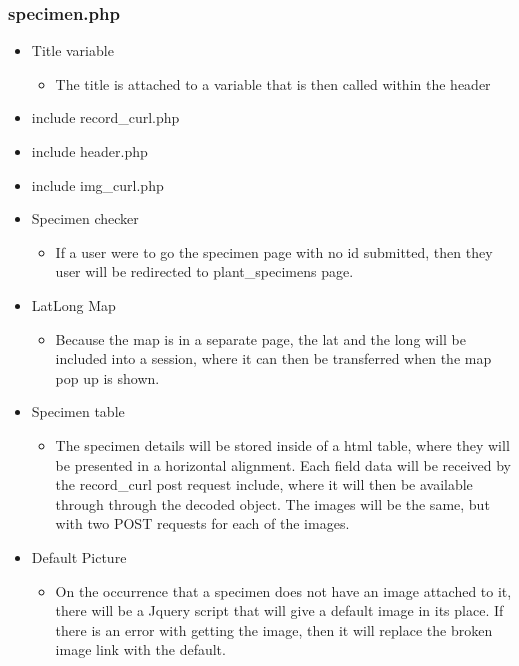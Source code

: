 

    \subsubsection{specimen.php}
        \begin{itemize}
            \item Title variable
            \begin{itemize}
                \item The title is attached to a variable that is then called within the header
            \end{itemize}
            \item include record\_curl.php
            \item include header.php
            \item include img\_curl.php
            \item Specimen checker
            \begin{itemize}
                \item If a user were to go the specimen page with no id submitted, then they user will be redirected to plant\_specimens page.
            \end{itemize}
            \item LatLong Map
            \begin{itemize}
                \item Because the map is in a separate page, the lat and the long will be included into a session, where it can then be transferred when the map pop up is shown.
            \end{itemize}
            \item Specimen table
            \begin{itemize}
                \item The specimen details will be stored inside of a html table, where they will be presented in a horizontal alignment. Each field data will be received by the record\_curl post request include, where it will then be available through through the decoded object. The images will be the same, but with two POST requests for each of the images.
            \end{itemize}
            \item Default Picture
            \begin{itemize}
                \item On the occurrence that a specimen does not have an image attached to it, there will be a Jquery script that will give a default image in its place. If there is an error with getting the image, then it will replace the broken image link with the default.

\end{itemize}
\end{itemize}
